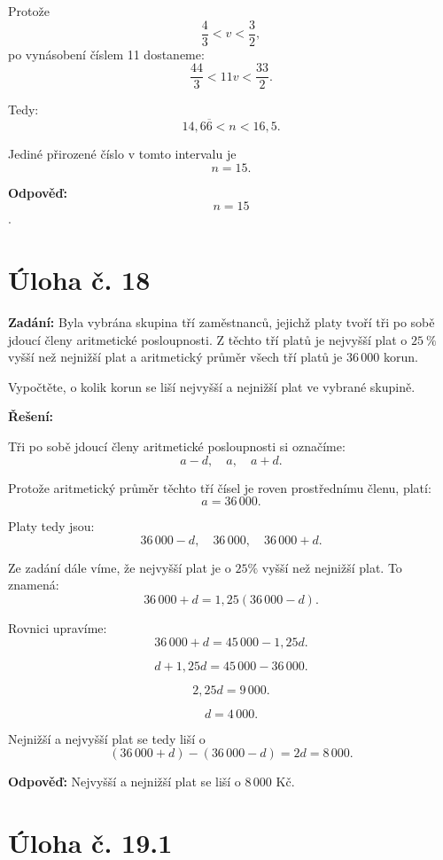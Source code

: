 \documentclass[12pt,a4paper]{article}
\begin{document}
Protože
\[
\frac{4}{3}<v<\frac{3}{2},
\]
po vynásobení číslem 11 dostaneme:
\[
\frac{44}{3}<11v<\frac{33}{2}.
\]

Tedy:
\[
14{,}6\overline{6}<n<16{,}5.
\]

Jediné přirozené číslo v tomto intervalu je
\[
n=15.
\]

\bigskip

\textbf{Odpověď:}  
\[
n=15
\].


\newpage
\section*{Úloha č. 18}

\textbf{Zadání:}  
Byla vybrána skupina tří zaměstnanců, jejichž platy tvoří tři po sobě jdoucí členy aritmetické posloupnosti. Z těchto tří platů je nejvyšší plat o \(25\ \%\) vyšší než nejnižší plat a aritmetický průměr všech tří platů je \(36\,000\) korun.

Vypočtěte, o kolik korun se liší nejvyšší a nejnižší plat ve vybrané skupině.

\bigskip

\textbf{Řešení:}

Tři po sobě jdoucí členy aritmetické posloupnosti si označíme:
\[
a-d,\quad a,\quad a+d.
\]

Protože aritmetický průměr těchto tří čísel je roven prostřednímu členu, platí:
\[
a=36\,000.
\]

Platy tedy jsou:
\[
36\,000-d,\quad 36\,000,\quad 36\,000+d.
\]

Ze zadání dále víme, že nejvyšší plat je o \(25\%\) vyšší než nejnižší plat. To znamená:
\[
36\,000+d = 1{,}25(36\,000-d).
\]

Rovnici upravíme:
\[
36\,000+d = 45\,000-1{,}25d.
\]

\[
d+1{,}25d = 45\,000-36\,000.
\]

\[
2{,}25d = 9\,000.
\]

\[
d = 4\,000.
\]

Nejnižší a nejvyšší plat se tedy liší o
\[
(36\,000+d)-(36\,000-d)=2d=8\,000.
\]

\bigskip

\textbf{Odpověď:}  
Nejvyšší a nejnižší plat se liší o \(8\,000\text{ Kč}\).


\newpage
\section*{Úloha č. 19.1}
\end{document}
